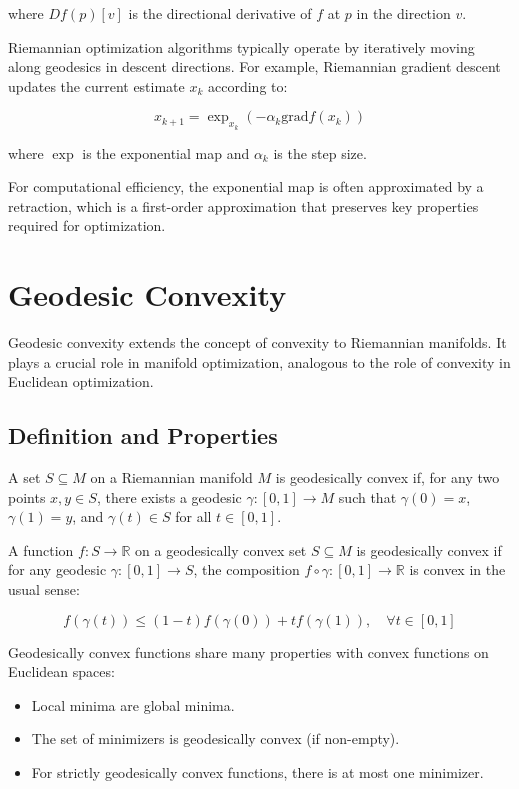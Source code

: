 where $D f(p)[v]$ is the directional derivative of $f$ at $p$ in the direction $v$.

Riemannian optimization algorithms typically operate by iteratively moving along geodesics in descent directions. For example, Riemannian gradient descent updates the current estimate $x_k$ according to:

\begin{equation}
x_{k+1} = \exp_{x_k}(-\alpha_k \text{grad} f(x_k))
\end{equation}

where $\exp$ is the exponential map and $\alpha_k$ is the step size.

For computational efficiency, the exponential map is often approximated by a retraction, which is a first-order approximation that preserves key properties required for optimization.

\section{Geodesic Convexity}

Geodesic convexity extends the concept of convexity to Riemannian manifolds. It plays a crucial role in manifold optimization, analogous to the role of convexity in Euclidean optimization.

\subsection{Definition and Properties}

A set $S \subseteq M$ on a Riemannian manifold $M$ is geodesically convex if, for any two points $x, y \in S$, there exists a geodesic $\gamma: [0, 1] \rightarrow M$ such that $\gamma(0) = x$, $\gamma(1) = y$, and $\gamma(t) \in S$ for all $t \in [0, 1]$.

A function $f: S \rightarrow \mathbb{R}$ on a geodesically convex set $S \subseteq M$ is geodesically convex if for any geodesic $\gamma: [0, 1] \rightarrow S$, the composition $f \circ \gamma: [0, 1] \rightarrow \mathbb{R}$ is convex in the usual sense:

\begin{equation}
f(\gamma(t)) \leq (1-t)f(\gamma(0)) + tf(\gamma(1)), \quad \forall t \in [0, 1]
\end{equation}

Geodesically convex functions share many properties with convex functions on Euclidean spaces:

\begin{itemize}
\item Local minima are global minima.
\item The set of minimizers is geodesically convex (if non-empty).
\item For strictly geodesically convex functions, there is at most one minimizer.
\end{itemize}

